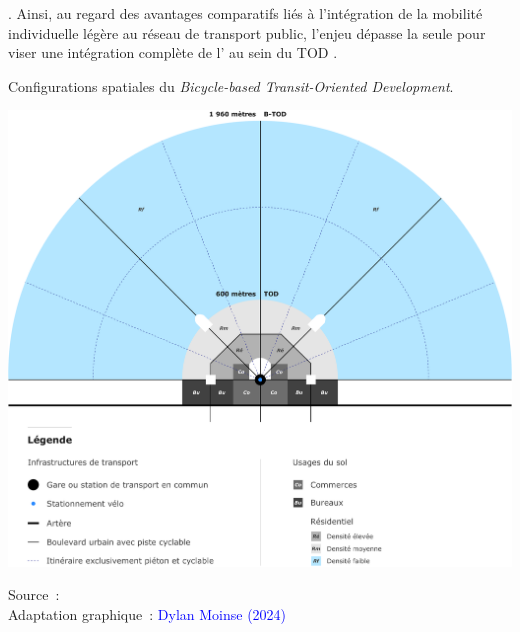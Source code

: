 \begin{refsegment}
{} \textcolor{blue}{\autocite[102]{calthorpe_next_1993}}. Ainsi, au regard des avantages comparatifs liés à l’intégration de la mobilité individuelle légère au réseau de transport public, l’enjeu dépasse la seule  pour viser une intégration complète de l’ au sein du \acrshort{TOD} \textcolor{blue}{\autocite[112]{ibraeva_transit-oriented_2020}}.%

    \begin{carte}[h!]\vspace*{4pt}
        \caption{Configurations spatiales du \textsl{Bicycle-based Transit-Oriented Development}.}
        \label{fig-chap1:schema-b-tod}
        \centerline{\includegraphics[width=1\columnwidth]{src/Figures/Chap-1/FR_Schema_B_TOD.pdf}}
        \vspace{5pt}
        \begin{flushright}\scriptsize{
        Source~: \textcolor{blue}{\textcite[979]{lee_bicycle-based_2016}}
        \\
        Adaptation graphique~: \textcolor{blue}{Dylan Moinse (2024)}
        }\end{flushright}
    \end{carte}


\end{refsegment}
